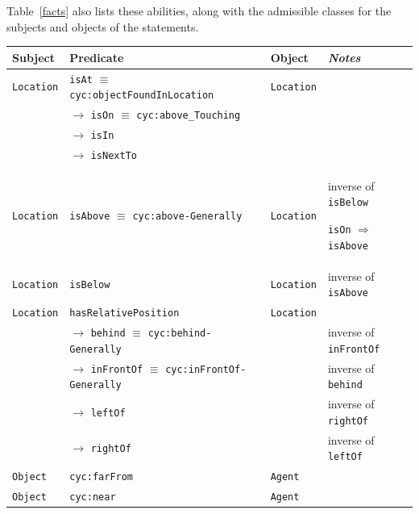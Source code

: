 \documentclass[preprint,3p,times]{elsarticle}
\newcommand{\concept}[1]{{\small \texttt{#1}}}
\begin{document}
Table~\ref{facts} also lists these abilities, along with the admissible classes
for the subjects and objects of the statements.

\renewcommand{\concept}[1]{{\scriptsize \texttt{#1}}}
\begin{table}[h]
    \centering
    \begin{tabular}{p{1.5cm}lp{2cm}p{5cm}}
    \textbf{Subject} & \textbf{Predicate} & \textbf{Object} & \emph{Notes} \\ 
    \hline
	 \concept{Location} & \concept{isAt} $\equiv$ \concept{cyc:objectFoundInLocation}  &  \concept{Location} & \\ 
	 &  $\rightarrow$ \concept{isOn} $\equiv$ \concept{cyc:above\_Touching}  &  & \\ 
	 &  $\rightarrow$ \concept{isIn}  &  & \\ 
	 &  $\rightarrow$ \concept{isNextTo}  & &  \\ 
	 \concept{Location}  & \concept{isAbove} $\equiv$ \concept{cyc:above-Generally}  &  \concept{Location}  &  inverse of \concept{isBelow} \par \concept{isOn} $\Rightarrow$ \concept{isAbove}\\ 
	 \concept{Location}  & \concept{isBelow}  & \concept{Location}  &  inverse
	of \concept{isAbove} \\
	\hline
	 \concept{Location}  & \concept{hasRelativePosition}  & \concept{Location} & \\ 
	 & 	$\rightarrow$ \concept{behind} $\equiv$ \concept{cyc:behind-Generally}  &  & inverse of \concept{inFrontOf}  \\ 
	 &  $\rightarrow$ \concept{inFrontOf} $\equiv$ \concept{cyc:inFrontOf-Generally}  & 	 & 	 inverse of \concept{behind}  \\ 
	 &  $\rightarrow$ \concept{leftOf}  &  &  inverse of \concept{rightOf} \\ 
	 &  $\rightarrow$ \concept{rightOf}  & 	 & 	 inverse of \concept{leftOf}  \\ 
	 \concept{Object}  & \concept{cyc:farFrom}  &  \concept{Agent} & \\ 
	 \concept{Object}  & \concept{cyc:near}  &  \concept{Agent} & \\


\end{tabular}
\end{table}
\end{document}
